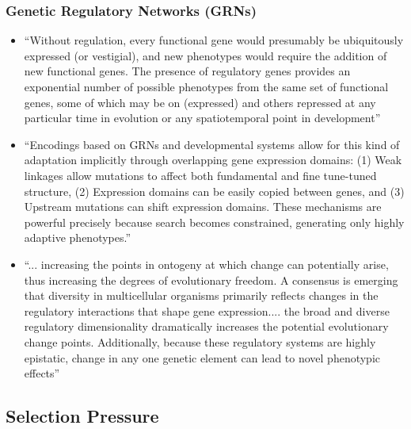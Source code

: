   \subsubsection{Genetic Regulatory Networks (GRNs)}
  \begin{itemize}
    \item ``Without regulation, every functional gene would presumably be ubiquitously expressed (or vestigial), and new phenotypes would require the addition of new functional genes. The presence of regulatory genes provides an exponential number of possible phenotypes from the same set of functional genes, some of which may be on (expressed) and others repressed at any particular time in evolution or any spatiotemporal point in development'' \cite[p 220]{Downing2015IntelligenceSystems}
    \item ``Encodings based on GRNs and developmental systems allow for this kind of adaptation implicitly through overlapping gene expression domains: (1) Weak linkages allow mutations to affect both fundamental and fine tune-tuned structure, (2) Expression domains can be easily copied between genes, and (3) Upstream mutations can shift expression domains. These mechanisms are powerful precisely because search becomes constrained, generating only highly adaptive phenotypes.'' \cite{Reisinger2007AcquiringRepresentations}
    \item ``... increasing the points in ontogeny at which change can potentially arise, thus increasing the degrees of evolutionary freedom. A consensus is emerging that diversity in multicellular organisms primarily reflects changes in the regulatory interactions that shape gene expression.... the broad and diverse regulatory dimensionality dramatically increases the potential evolutionary change points. Additionally, because these regulatory systems are highly epistatic, change in any one genetic element can lead to novel phenotypic effects'' \cite{Moczek2011TheInnovation}
    \end{itemize}
  
\subsection{Selection Pressure} 

